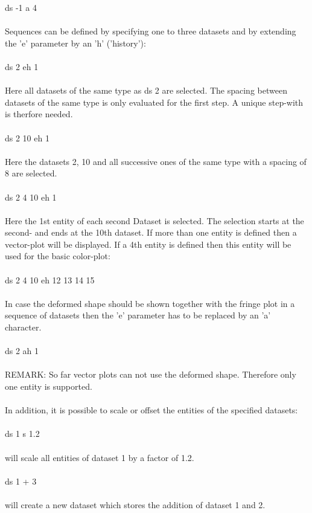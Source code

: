 \documentclass{article}
\begin{document}
ds -1 a 4\\\\
Sequences can be defined by specifying one to three datasets and by extending the 'e' parameter by an 'h' ('history'):\\\\
ds 2 eh 1\\\\
Here all datasets of the same type as ds 2 are selected. The spacing between datasets of the same type is only evaluated for the first step. A unique step-with is therfore needed.\\\\
ds 2 10 eh 1\\\\
Here the datasets 2, 10 and all successive ones of the same type with a spacing of 8 are selected.\\\\
ds 2 4 10 eh 1\\\\
Here the 1st entity of each second Dataset is selected. The selection starts at the second- and ends at the 10th dataset. If more than one entity is defined then a vector-plot will be displayed. If a 4th entity is defined then this entity will be used for the basic color-plot:\\\\
ds 2 4 10 eh 12 13 14 15\\\\
In case the deformed shape should be shown together with the fringe plot in a sequence of datasets then the 'e' parameter has to be replaced by an 'a' character.\\\\
ds 2 ah 1\\\\ REMARK: So far vector plots can not use the deformed shape. Therefore only one entity is supported.\\\\
In addition, it is possible to scale or offset the entities of the specified datasets:\\\\
ds 1 s 1.2\\\\
will scale all entities of dataset 1 by a factor of 1.2.\\\\
ds 1 + 3\\\\
will create a new dataset which stores the addition of dataset 1 and 2.\\\\ 
\end{document}

